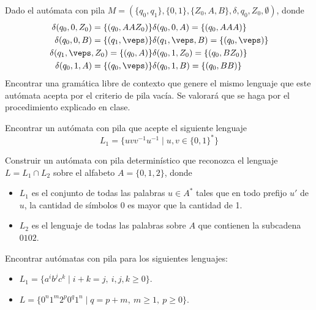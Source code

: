 \begin{ejercicio}\label{ej:1.5.13}
    Dado el autómata con pila $M = (\{q_0,q_1\},\{0,1\},\{Z_0,A,B\},\delta,q_0,Z_0,\emptyset )$, donde
    \begin{align*}
        \delta(q_0,0,Z_0) = \{(q_0,AAZ_0)\} &\delta(q_0, 0, A) = \{(q_0,AAA)\} \\
        \delta(q_0,0,B) = \{(q_1,\veps)\} &\delta(q_1, \veps, B) = \{(q_0,\veps)\} \\
        \delta(q_1,\veps,Z_0) = \{(q_0,A)\} &\delta(q_0, 1, Z_0) = \{(q_0,BZ_0)\} \\
        \delta(q_0,1,A) = \{(q_0,\veps)\} &\delta(q_0, 1, B) = \{(q_0,BB)\} 
    \end{align*}
    Encontrar una gramática libre de contexto que genere el mismo lenguaje que este autómata acepta por el criterio de pila vacía. Se valorará que se haga por el procedimiento explicado en clase.
\end{ejercicio}

\begin{ejercicio}\label{ej:1.5.14}
    Encontrar un autómata con pila que acepte el siguiente lenguaje
    \begin{equation*}
        L_1 = \{uvv^{-1}u^{-1}\mid u,v\in {\{0,1\}}^{\ast}\}
    \end{equation*}
\end{ejercicio}

\begin{ejercicio}\label{ej:1.5.15}
    Construir un autómata con pila determinístico que reconozca el lenguaje $L=L_1\cap L_2$ sobre el alfabeto $A = \{0,1,2\}$, donde
    \begin{itemize}
        \item $L_1$ es el conjunto de todas las palabras $u\in A^\ast$ tales que en todo prefijo $u'$ de $u$, la cantidad de símbolos 0 es mayor que la cantidad de 1.
        \item $L_2$ es el lenguaje de todas las palabras sobre $A$ que contienen la subcadena $0102$.
    \end{itemize}
\end{ejercicio}

\begin{ejercicio}\label{ej:1.5.16}
    Encontrar autómatas con pila para los siguientes lenguajes:
    \begin{itemize}
        \item $L_1 = \{a^i b^j c^k \mid i+k = j,\ i,j,k\geq 0\}$.
        \item $L = \{0^n 1^m 2^p 0^q 1^n \mid q = p + m,\ m\geq 1,\ p\geq 0\}$.
    \end{itemize}
\end{ejercicio}

